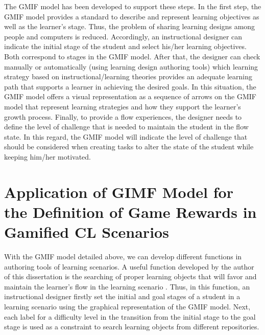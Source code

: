 The GMIF model has been developed to support these steps. In the first step, the GMIF model provides a standard to describe and represent learning objectives as well as the learner’s stage. Thus, the problem of sharing learning designs among people and computers is reduced. Accordingly, an instructional designer can indicate the initial stage of the student and select his/her learning objectives. Both correspond to stages in the GMIF model. After that, the designer can check manually or automatically (using learning design authoring tools) which learning strategy based on instructional/learning theories provides an adequate learning path that supports a learner in achieving the desired goals. In this situation, the GMIF model offers a visual representation as a sequence of arrows on the GMIF model that represent learning strategies and how they support the learner’s growth process. Finally, to provide a flow experiences, the designer needs to define the level of challenge that is needed to maintain the student in the flow state. In this regard, the GMIF model will indicate the level of challenge that should be considered when creating tasks to alter the state of the student while keeping him/her motivated.

\section[Application of GIMF Model for the Definition of Game Rewards]{Application of GIMF Model for the Definition of Game Rewards in Gamified CL Scenarios}
\label{sec:application-giving-rewards-by-gimf-model}

With the GMIF model detailed above, we can develop different functions in authoring tools of learning scenarios. A useful function developed by the author of this dissertation is the searching of proper learning objects that will favor and maintain the learner’s flow in the learning scenario \cite{ChallcoAndradeBorgesBittencourtIsotani2016}. Thus, in this function, an instructional designer firstly set the initial and goal stages of a student in a learning scenario using the graphical representation of the GMIF model. Next, each label for a difficulty level in the transition from the initial stage to the goal stage is used as a constraint to search learning objects from different repositories. 

